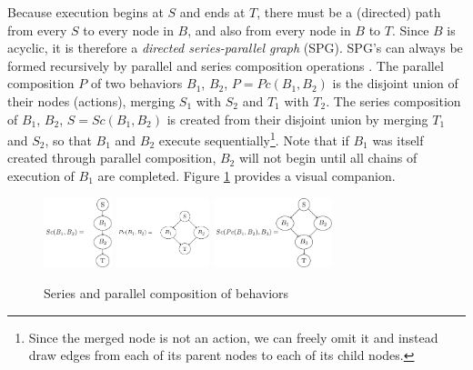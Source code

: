 \documentclass[conference]{IEEEtran}
\theoremstyle{definition}
\begin{document}
Because execution begins at \(S\) and ends at \(T\), there must be a (directed)
path from every \(S\) to every node in \(B\), and also from every node in \(B\)
to \(T\). Since \(B\) is acyclic, it is therefore a \textit{directed series-parallel graph} (SPG).
SPG's can always be formed recursively by parallel and series composition
operations \cite{valdes1979recognition}. The parallel composition \(P\) of two behaviors \(B_1\),
\(B_2\), \(P = Pc(B_1, B_2)\) is the disjoint union of their nodes (actions),
merging \(S_1\) with \(S_2\) and \(T_1\) with \(T_2\). The series composition
of \(B_1\), \(B_2\), \(S = Sc(B_1, B_2)\) is created from their disjoint union
by merging \(T_1\) and \(S_2\), so that \(B_1\) and \(B_2\) execute
sequentially\footnote{Since the merged node is not an action, we can freely
omit it and instead draw edges from each of its parent nodes to each of its
child nodes.}.  Note that if \(B_1\) was itself created through parallel
composition, \(B_2\) will not begin until all chains of execution of \(B_1\)
are completed. Figure \ref{fig:graph-composition} provides a visual companion.

\begin{figure}
\begin{center}
\includegraphics[height=0.8in]{images/tikz/series.pdf}
\includegraphics[height=0.8in]{images/tikz/parallel.pdf} \vspace{0.in}
\includegraphics[height=0.8in]{images/tikz/parallel-and-series.pdf}
\end{center}
\caption{Series and parallel composition of behaviors }
\label{fig:graph-composition}
\end{figure}
\end{document}

